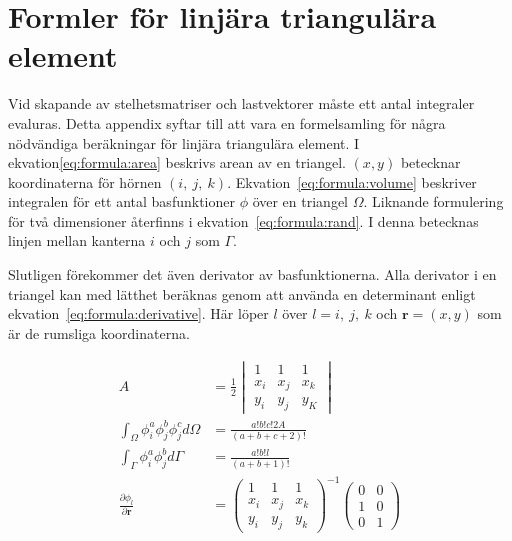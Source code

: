 \chapter{Formler för linjära triangulära element}
\label{sec:integrationformulae}


Vid skapande av stelhetsmatriser och lastvektorer måste ett antal integraler
evaluras. Detta appendix syftar till att vara en formelsamling för några
nödvändiga beräkningar för linjära triangulära element. I ekvation\eqref{eq:formula:area} beskrivs arean av en triangel. $(x,y)$ betecknar koordinaterna
för hörnen $(i,~j,~k)$. Ekvation~\eqref{eq:formula:volume} beskriver integralen för ett
antal basfunktioner $\phi$ över en triangel $\Omega$. Liknande formulering för två dimensioner
återfinns i ekvation~\eqref{eq:formula:rand}. I denna betecknas linjen mellan kanterna
$i$ och $j$ som $\Gamma$.\cite{lewis04}

Slutligen förekommer det även derivator av basfunktionerna. Alla derivator i en triangel
kan med lätthet beräknas genom att använda en determinant enligt ekvation~\eqref{eq:formula:derivative}. Här löper $l$ över $l=i,~j,~k$ och $\mathbf{r} = (x,y)$ som är
de rumsliga koordinaterna.\cite{fem50}

\begin{align}
\label{eq:formula:area}
A &=
\frac{1}{2}
\begin{vmatrix}
1 & 1 & 1 \\
x_i & x_j & x_k \\
y_i & y_j & y_K
\end{vmatrix} \\
\label{eq:formula:volume}
\int_\Omega \phi^a_i\phi^b_j\phi^c_j d\Omega &=
\frac{a!b!c!2A}{(a+b+c+2)!} \\
\label{eq:formula:rand}
\int_\Gamma \phi^a_i \phi^b_j d\Gamma &=
\frac{a!b!l}{(a+b+1)!} \\
\label{eq:formula:derivative}
\frac{\partial \phi_l}{\partial \mathbf{r} } &=
\begin{pmatrix}
1 & 1 & 1 \\
x_i & x_j & x_k \\
y_i & y_j & y_k  
\end{pmatrix}^{-1}
\begin{pmatrix}
0 & 0 \\
1 & 0 \\
0 & 1
\end{pmatrix}
\end{align}


